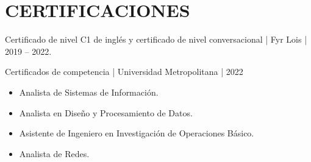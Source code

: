 \documentclass[10pt,a4paper]{article}
\begin{document}
\section*{CERTIFICACIONES}
Certificado de nivel C1 de inglés y certificado de nivel conversacional | Fyr Lois | 2019 -- 2022.

Certificados de competencia | Universidad Metropolitana | 2022
\begin{itemize}
    \item Analista de Sistemas de Información.
    \item Analista en Diseño y Procesamiento de Datos.
    \item Asistente de Ingeniero en Investigación de Operaciones Básico.
    \item Analista de Redes.
\end{itemize}
\end{document}
